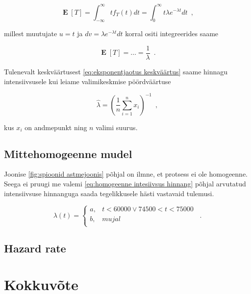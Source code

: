 \documentclass{article}
\theoremstyle{definition}
\DeclareMathOperator*{\MEAN}{\mathbf{E}}
\newcommand{\mean}[1]{\MEAN\left[#1\right]}
\begin{document}
\begin{equation*}
    \mean{T} = \int_{- \infty}^{\infty} t f_T(t) dt = \int_{0}^{\infty} t \lambda e^{- \lambda t} dt \enspace ,
\end{equation*}

millest muutujate $u = t$ ja $dv = \lambda e^{- \lambda t} dt$ korral ositi integreerides saame

\begin{equation}
    \label{eq:eksponentjaotus keskväärtus}
    \mean{T} = \dots = \frac{1}{\lambda} \enspace .
\end{equation}

Tulenevalt keskväärtusest \eqref{eq:eksponentjaotus keskväärtus} saame hinnagu intensiivsusele kui leiame valimikeskmise pöördväärtuse

\begin{equation}
    \label{eq:homogeenne intesiivsus hinnang}
    \hat{\lambda} = \left( \frac{1}{n} \sum_{i = 1}^{n} x_i \right)^{-1} \enspace ,
\end{equation}

kus $x_i$ on andmepunkt ning $n$ valimi suurus.

\subsection{Mittehomogeenne mudel}

Joonise \ref{fig:spioonid astmejoonis} põhjal on ilmne, et protsess ei ole homogeenne. Seega ei pruugi me valemi \eqref{eq:homogeenne intesiivsus hinnang} põhjal arvutatud intensiivsuse hinnanguga saada tegelikkusele hästi vastavaid tulemusi.

\begin{equation*}
    \lambda(t) =
    \begin{cases}
        a , &t < 60 000 \lor 74 500 < t < 75 000 \\
        b , &mujal \\
    \end{cases}
    \enspace .
\end{equation*}

\subsection{Hazard rate}


\section{Kokkuvõte}


\printbibliography[title={Kasutatud allikad}]
\end{document}
